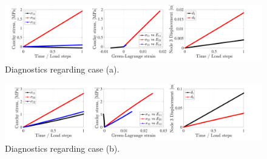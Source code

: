 \begin{figure}[!ht]
    \centering
    \includegraphics[width=\linewidth]{final/part1/final1_stretch.pdf}
    \caption{Diagnostics regarding case (a). }    
    \label{fig:final1_stretch}
\end{figure}

\begin{figure}[!ht]
    \centering
    \includegraphics[width=\linewidth]{final/part1/final1_shear.pdf}
    \caption{Diagnostics regarding case (b). }    
    \label{fig:final1_shear}
\end{figure}

